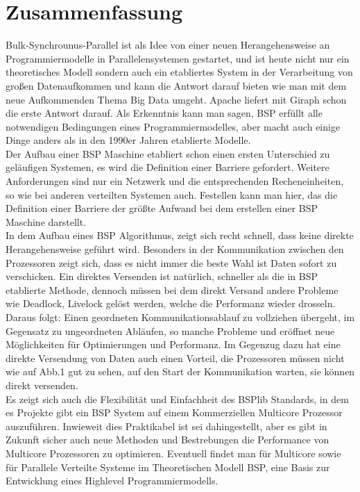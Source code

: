 \documentclass[a4paper,10pt]{scrartcl}
\begin{document}
\section{Zusammenfassung}
Bulk-Synchrounus-Parallel ist als Idee von einer neuen Herangehensweise an Programmiermodelle in Parallelensystemen gestartet, und ist heute nicht nur ein theoretisches Modell sondern auch ein etabliertes System in der Verarbeitung von großen Datenaufkommen und kann die Antwort darauf bieten wie man mit dem neue Aufkommenden Thema Big Data umgeht. Apache liefert mit Giraph schon die erste Antwort darauf. Als Erkenntnis kann man sagen, BSP erfüllt alle notwendigen Bedingungen eines Programmiermodelles, aber macht auch einige Dinge anders als in den 1990er Jahren etablierte Modelle.\\
Der Aufbau einer BSP Maschine etabliert schon einen ersten Unterschied zu geläufigen Systemen, es wird die Definition einer Barriere gefordert. Weitere Anforderungen sind nur ein Netzwerk und die entsprechenden Recheneinheiten, so wie bei anderen verteilten Systemen auch. Festellen kann man hier, das die Definition einer Barriere der größte Aufwand bei dem erstellen einer BSP Maschine darstellt.\\
In dem Aufbau eines BSP Algorithmus, zeigt sich recht schnell, dass keine direkte Herangehensweise geführt wird. Besonders in der Kommunikation zwischen den Prozessoren zeigt sich, dass es nicht immer die beste Wahl ist Daten sofort zu verschicken. Ein direktes Versenden ist natürlich, schneller als die in BSP etablierte Methode, dennoch müssen bei dem direkt Versand andere Probleme wie Deadlock, Livelock gelöst werden, welche die Performanz wieder drosseln. Daraus folgt: Einen geordneten Kommunikationsablauf zu vollziehen übergeht, im Gegensatz zu ungeordneten Abläufen, so manche Probleme und eröffnet neue Möglichkeiten für Optimierungen und Performanz. Im Gegenzug dazu hat eine direkte Versendung von Daten auch einen Vorteil, die Prozessoren müssen nicht wie auf Abb.1 gut zu sehen, auf den Start der Kommunikation warten, sie können direkt versenden.\\  
Es zeigt sich auch die Flexibilität und Einfachheit des BSPlib Standards, in dem es Projekte gibt ein BSP System auf einem Kommerziellen Multicore Prozessor auszuführen. Inwieweit dies Praktikabel ist sei dahingestellt, aber es gibt in Zukunft sicher auch neue Methoden und Bestrebungen die Performance von Multicore Prozessoren zu optimieren. Eventuell findet man für Multicore sowie für Parallele Verteilte Systeme im Theoretischen Modell BSP, eine Basis zur Entwicklung eines Highlevel Programmiermodells.\\
\end{document}
